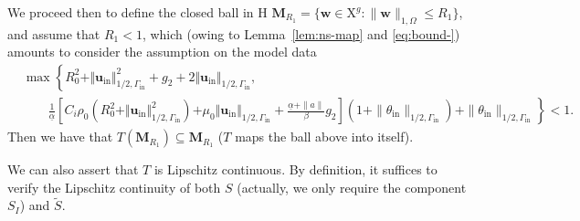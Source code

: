 \documentclass[onefignum,onetabnum,reqno,a4paper,final]{siamart250211}
\newcommand\bu{\boldsymbol{u}}
\newcommand\bw{\boldsymbol{w}}
\newcommand\bM{\mathbf{M}}
\newcommand\0{\mathbf{0}}
\newcommand\bU{\boldsymbol{U}}
\newcommand\bH{\boldsymbol{\mathrm{H}}}
\newcommand\bX{\boldsymbol{\mathrm{X}}}
\newcommand\Gi{\Gamma_{\mathrm{in}}}
\newcommand\buin{\boldsymbol{u}_{\mathrm{in}}}
\numberwithin{figure}{section}
\numberwithin{table}{section}
\begin{document}
	We proceed then to define the closed ball in $\bH$ 
	$\bM_{R_1} = \{\bw \in \bX^g: \|\bw\|_{1,\Omega} \leq   R_1\}$,  
	and assume that $R_1<1$, which (owing to Lemma~\ref{lem:ns-map} and \eqref{eq:bound-}) amounts to consider the assumption on the model data 
	\begin{equation}
		\label{eq:assumption-data}
	\begin{aligned}
	   & \max\left\{  R_0^ 2+ \Vert \buin\Vert_{1/2,\Gi}^2 + g_2 + 2\Vert \buin\Vert_{1/2,\Gi},\right. \\
    & \qquad \frac{1}{\underline{\alpha}}\left[
    C_i\rho_0(R_0^ 2 +\Vert \bu_{\mathrm{in}}\Vert_{1/2,\Gi}^2)%
    \left.
    + \mu_0\Vert \bu_{\mathrm{in}}\Vert_{1/2,\Gi}
    +\frac{\underline{\alpha}+\|a\|}{\beta}g_2\right] (1 + \|\theta_{\mathrm{in}}\|_{1/2,\Gi}) + \|\theta_{\mathrm{in}}\|_{1/2,\Gi} \right\} <1.\end{aligned}
	\end{equation}
	Then we have that $T(\bM_{R_1}) \subseteq \bM_{R_1}$ ($T$ maps the ball above into itself). 
	
	We can also assert that $T$ is Lipschitz continuous. By definition, it suffices to verify the Lipschitz continuity of both $S$ (actually, we only require the component $S_I$) and $\tilde{S}$. 
	
\end{document}
